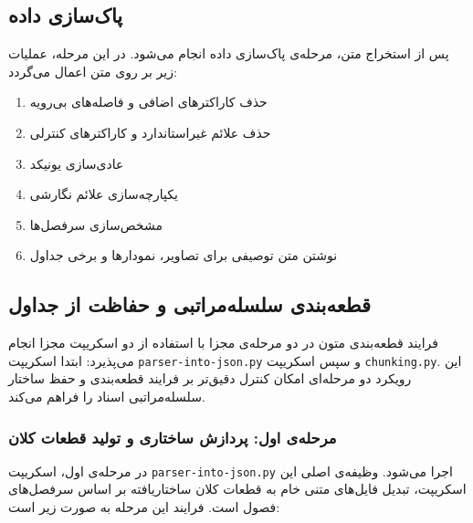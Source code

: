 \subsection{پاک‌سازی داده}

پس از استخراج متن، مرحله‌ی پاک‌سازی داده انجام می‌شود. در این مرحله، عملیات زیر بر روی متن اعمال می‌گردد:

\begin{enumerate}
\item حذف کاراکترهای اضافی و فاصله‌های بی‌رویه
\item حذف علائم غیراستاندارد و کاراکترهای کنترلی
\item عادی‌سازی یونیکد
\item یکپارچه‌سازی علائم نگارشی
\item مشخص‌سازی سرفصل‌ها 
\item نوشتن متن توصیفی برای تصاویر، نمودار‌ها و برخی جداول
\end{enumerate}

\subsection{قطعه‌بندی سلسله‌مراتبی و حفاظت از جداول}

فرایند قطعه‌بندی متون در دو مرحله‌ی مجزا با استفاده از دو اسکریپت مجزا انجام می‌پذیرد: ابتدا اسکریپت \texttt{parser-into-json.py} و سپس اسکریپت \texttt{chunking.py}. این رویکرد دو مرحله‌ای امکان کنترل دقیق‌تر بر فرایند قطعه‌بندی و حفظ ساختار سلسله‌مراتبی اسناد را فراهم می‌کند.

\subsubsection{مرحله‌ی اول: پردازش ساختاری و تولید قطعات کلان}

در مرحله‌ی اول، اسکریپت \texttt{parser-into-json.py} اجرا می‌شود. وظیفه‌ی اصلی این اسکریپت، تبدیل فایل‌های متنی خام به قطعات کلان ساختاریافته بر اساس سرفصل‌های فصول است. فرایند این مرحله به صورت زیر است:

